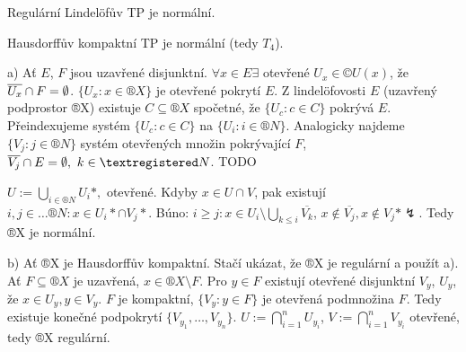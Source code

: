 \documentclass[12pt]{article}					%
\begin{document}
    \begin{veta}
        Regulární Lindelöfův TP je normální.

        Hausdorffův kompaktní TP je normální (tedy $T_4$).

        \begin{dukazin}
                a) Ať $E$, $F$ jsou uzavřené disjunktní. $\forall x \in E \exists$ otevřené $U_x \in ©U(x)$, že $\overline{U_x} \cap F = \emptyset$. $\{U_x: x\in ®X\}$ je otevřené pokrytí $E$. Z lindelöfovosti $E$ (uzavřený podprostor ®X) existuje $C \subseteq ®X$ spočetné, že $\{U_c: c \in C\}$ pokrývá $E$. Přeindexujeme systém $\{U_c: c \in C\}$ na $\{U_i: i \in ®N\}$. Analogicky najdeme $\{V_j: j \in ®N\}$ systém otevřených množin pokrývající $F$, $\overline{V_j} \cap E = \O,\ k \in ®N$. TODO

                $U := \bigcup_{i \in ®N} U_i*, $ otevřené. Kdyby $x \in U \cap V$, pak existují $i, j \in …®N: x \in U_i*\cap V_j*$. Búno: $i ≥ j: x \in U_i \setminus \bigcup_{k ≤ i} \overline{V_k}$, $x \notin \overline{V_j}, x \notin V_j* \lightning$. Tedy ®X je normální.

                b) Ať ®X je Hausdorffův kompaktní. Stačí ukázat, že ®X je regulární a použít a). Ať $F \subseteq ®X$ je uzavřená, $x \in ®X \setminus F$. Pro $y \in F$ existují otevřené disjunktní $V_y$, $U_y$, že $x \in U_y, y \in V_y$. $F$ je kompaktní, $\{V_y : y \in F\}$ je otevřená podmnožina $F$. Tedy existuje konečné podpokrytí $\{V_{y_1}, …, V_{y_n}\}$. $U := \bigcap_{i = 1}^n U_{y_i}$, $V := \bigcap_{i = 1}^n V_{y_i}$ otevřené, tedy ®X regulární.
        \end{dukazin}
    \end{veta}
\end{document}
